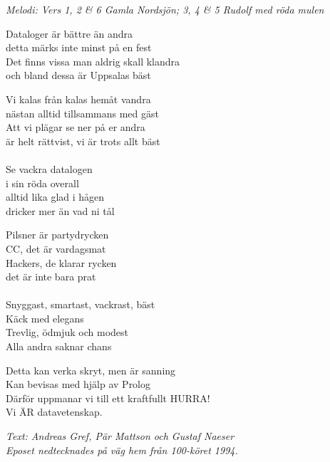 {\footnotesize\textit{Melodi: Vers 1, 2 \& 6 Gamla Nordsjön; 3, 4 \& 5 Rudolf med röda mulen}}\par
\vspace{10pt}
Dataloger är bättre än andra\\
detta märks inte minst på en fest\\
Det finns vissa man aldrig skall klandra\\
och bland dessa är Uppsalas bäst\par
\vspace{10pt}
Vi kalas från kalas hemåt vandra\\
nästan alltid tillsammans med gäst\\
Att vi plägar se ner på er andra\\
är helt rättvist, vi är trots allt bäst\\
\\
Se vackra datalogen\\
i sin röda overall\\
alltid lika glad i hågen\\
dricker mer än vad ni tål\par
\vspace{10pt}
Pilsner är partydrycken\\
CC, det är vardagsmat\\
Hackers, de klarar rycken\\
det är inte bara prat\\
\\
Snyggast, smartast, vackrast, bäst\\
Käck med elegans\\
Trevlig, ödmjuk och modest\\
Alla andra saknar chans\par
\vspace{10pt}
Detta kan verka skryt, men är sanning\\
Kan bevisas med hjälp av Prolog\\
Därför uppmanar vi till ett kraftfullt HURRA!\\
Vi ÄR datavetenskap.
\par
\vspace{10pt}
{\footnotesize\textit{Text: Andreas Gref, Pär Mattson och Gustaf Naeser\\
Eposet nedtecknades på väg hem från 100-köret 1994.}}
